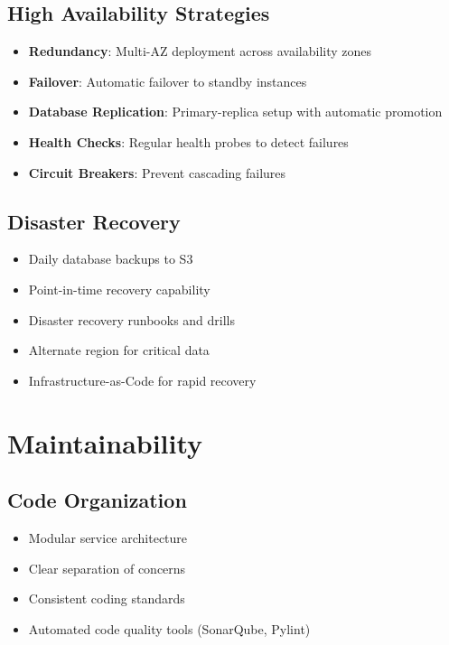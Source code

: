 \documentclass[12pt,a4paper]{report}
\begin{document}
\subsection{High Availability Strategies}

\begin{itemize}[label=\textbullet]
    \item \textbf{Redundancy}: Multi-AZ deployment across availability zones
    \item \textbf{Failover}: Automatic failover to standby instances
    \item \textbf{Database Replication}: Primary-replica setup with automatic promotion
    \item \textbf{Health Checks}: Regular health probes to detect failures
    \item \textbf{Circuit Breakers}: Prevent cascading failures
\end{itemize}

\subsection{Disaster Recovery}

\begin{itemize}[label=\textbullet]
    \item Daily database backups to S3
    \item Point-in-time recovery capability
    \item Disaster recovery runbooks and drills
    \item Alternate region for critical data
    \item Infrastructure-as-Code for rapid recovery
\end{itemize}

\section{Maintainability}

\subsection{Code Organization}

\begin{itemize}[label=\textbullet]
    \item Modular service architecture
    \item Clear separation of concerns
    \item Consistent coding standards
    \item Automated code quality tools (SonarQube, Pylint)
\end{itemize}
\end{document}

